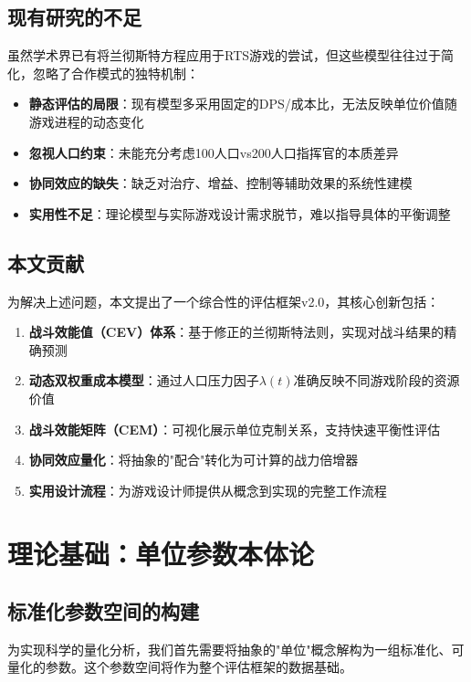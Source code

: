 \documentclass[a4paper,12pt]{article}
\begin{document}
\begin{CJK}{UTF8}{gbsn}
\subsection{现有研究的不足}
虽然学术界已有将兰彻斯特方程\cite{lanchester1916}应用于RTS游戏的尝试\cite{uriarte2016}，但这些模型往往过于简化，忽略了合作模式的独特机制：

\begin{itemize}
\item \textbf{静态评估的局限}：现有模型多采用固定的DPS/成本比，无法反映单位价值随游戏进程的动态变化
\item \textbf{忽视人口约束}：未能充分考虑100人口vs200人口指挥官的本质差异
\item \textbf{协同效应的缺失}：缺乏对治疗、增益、控制等辅助效果的系统性建模
\item \textbf{实用性不足}：理论模型与实际游戏设计需求脱节，难以指导具体的平衡调整
\end{itemize}

\subsection{本文贡献}
为解决上述问题，本文提出了一个综合性的评估框架v2.0，其核心创新包括：

\begin{enumerate}
\item \textbf{战斗效能值（CEV）体系}：基于修正的兰彻斯特法则，实现对战斗结果的精确预测
\item \textbf{动态双权重成本模型}：通过人口压力因子$\lambda(t)$准确反映不同游戏阶段的资源价值
\item \textbf{战斗效能矩阵（CEM）}：可视化展示单位克制关系，支持快速平衡性评估
\item \textbf{协同效应量化}：将抽象的"配合"转化为可计算的战力倍增器
\item \textbf{实用设计流程}：为游戏设计师提供从概念到实现的完整工作流程
\end{enumerate}

\section{理论基础：单位参数本体论}

\subsection{标准化参数空间的构建}
为实现科学的量化分析，我们首先需要将抽象的"单位"概念解构为一组标准化、可量化的参数。这个参数空间将作为整个评估框架的数据基础。


\end{CJK}
\end{document}
